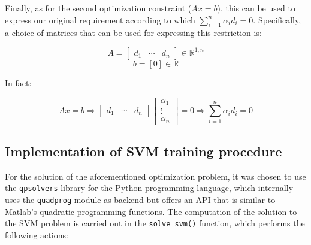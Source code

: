\documentclass[letterpaper,headings=standardclasses]{scrartcl}
\begin{document}
Finally, as for the second optimization constraint ($Ax = b$), this can be used to express our original requirement according to which $\sum_{i = 1}^n \alpha_i d_i = 0$. Specifically, a choice of matrices that can be used for expressing this restriction is:

$$ A = \left[ \begin{matrix} d_1 & \cdots & d_n \end{matrix} \right] \in \mathbb{R}^{1,n} $$
$$ b = [0] \in \mathbb{R} $$

In fact:

$$ Ax = b \Rightarrow \left[ \begin{matrix} d_1 & \cdots & d_n \end{matrix} \right] \left[ \begin{matrix} \alpha_1 \\ \vdots \\ \alpha_n \end{matrix} \right] = 0 \Rightarrow \sum_{i = 1}^n \alpha_i d_i = 0 $$

\subsection{Implementation of SVM training procedure}

For the solution of the aforementioned optimization problem, it was chosen to use the \texttt{qpsolvers} library for the Python programming language, which internally uses the \texttt{quadprog} module as backend but offers an API that is similar to Matlab's quadratic programming functions. The computation of the solution to the SVM problem is carried out in the \texttt{solve\_svm()} function, which performs the following actions:
\end{document}
